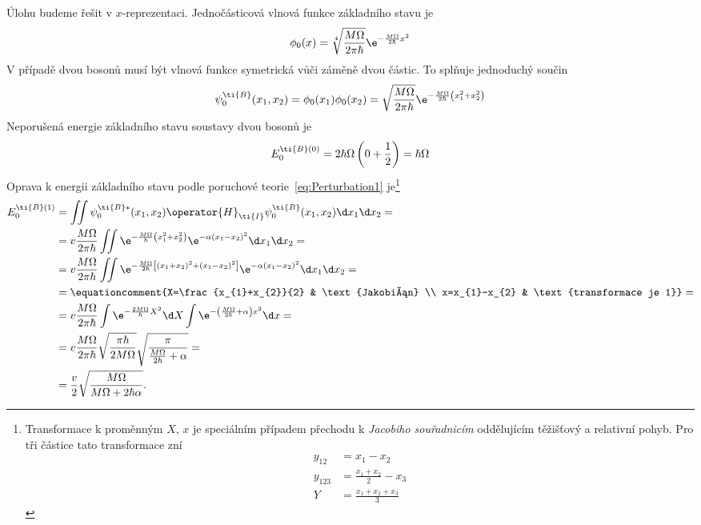 \begin{solution}
	Úlohu budeme řešit v $x$-reprezentaci.
	Jednočásticová vlnová funkce základního stavu je
	\begin{equation}
		\phi_{0}(x)
			=\sqrt[4]{\frac{M\Omega}{2\pi\hbar}}\e^{-\frac{M\Omega}{2\hbar}x^{2}}
	\end{equation}
	V případě dvou bosonů musí být vlnová funkce symetrická vůči záměně dvou částic.
	To splňuje jednoduchý součin
	\begin{equation}\label{eq:IdenticalBosonsWaveFunction}
		\psi_{0}^{\ti{B}}(x_{1},x_{2})
			=\phi_{0}(x_{1})\phi_{0}(x_{2})
			=\sqrt{\frac{M\Omega}{2\pi\hbar}}\e^{-\frac{M\Omega}{2\hbar}\left(x_{1}^{2}+x_{2}^{2}\right)}
	\end{equation}			
	Neporušená energie základního stavu soustavy dvou bosonů je
	\begin{equation}
		E_{0}^{\ti{B}(0)}
			=2\hbar\Omega\left(0+\frac{1}{2}\right)
			=\hbar\Omega
	\end{equation}
	Oprava k energii základního stavu podle poruchové teorie~\eqref{eq:Perturbation1} je\footnote{
		Transformace k proměnným $X$, $x$ je speciálním případem přechodu k \emph{Jacobiho souřadnicím}
		oddělujícím těžišťový a relativní pohyb.
		Pro tři částice tato transformace zní
        \begin{subequations}
            \begin{align}
                y_{12}&=x_{1}-x_{2}\\
                y_{123}&=\frac{x_{1}+x_{2}}{2}-x_{3}\\
                Y&=\frac{x_{1}+x_{2}+x_{3}}{3}
            \end{align}                
        \end{subequations}
	}
	\begin{align}
		E_{0}^{\ti{B}(1)}
			&=\iint\psi^{\ti{B}*}_{0}(x_{1},x_{2})\operator{H}_{\ti{I}}\psi_{0}^{\ti{B}}(x_{1},x_{2})\d x_{1}\d x_{2}=\nonumber\\
			&=v\frac{M\Omega}{2\pi\hbar}\iint\e^{-\frac{M\Omega}{\hbar}\left(x_{1}^{2}+x_{2}^{2}\right)}
				\e^{-\alpha\left(x_{1}-x_{2}\right)^{2}}\d x_{1}\d x_{2}=\nonumber\\
			&=v\frac{M\Omega}{2\pi\hbar}\iint\e^{-\frac{M\Omega}{2\hbar}
				\left[\left(x_{1}+x_{2}\right)^{2}+\left(x_{1}-x_{2}\right)^{2}\right]}
				\e^{-\alpha\left(x_{1}-x_{2}\right)^{2}}\d x_{1}\d x_{2}=\nonumber\\
			&=\equationcomment{X=\frac{x_{1}+x_{2}}{2} & \text{Jakobián} \\
				x=x_{1}-x_{2} & \text{transformace je 1}}=\nonumber\\
			&=v\frac{M\Omega}{2\pi\hbar}\int\e^{-\frac{2M\Omega}{\hbar}X^{2}}\d X
				\int\e^{-\left(\frac{M\Omega}{2\hbar}+\alpha\right)x^{2}}\d x=\nonumber\\
			&=v\frac{M\Omega}{2\pi\hbar}\sqrt{\frac{\pi\hbar}{2M\Omega}}
				\sqrt{\frac{\pi}{\frac{M\Omega}{2\hbar}+\alpha}}=\nonumber\\
			&=\frac{v}{2}\sqrt{\frac{M\Omega}{M\Omega+2\hbar\alpha}}.
	\end{align} 
\end{solution}
